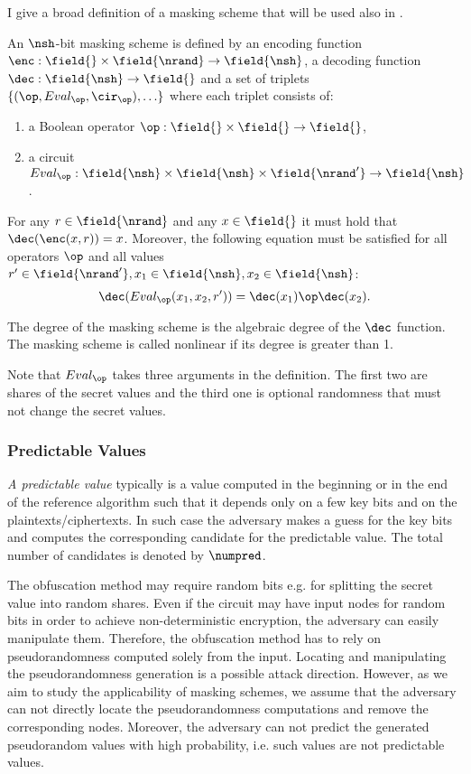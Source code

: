 I give a broad definition of a masking scheme that will be used also in .

\begin{definition}
An $\nsh$-bit masking scheme is defined by an encoding function $\enc: \field{} \times \field{\nrand} \to \field{\nsh}$, a decoding function $\dec: \field{\nsh} \to \field{}$ and a set of triplets $\{(\op, Eval_\op, \cir_\op), \ldots\}$ where each triplet consists of:
\begin{enumerate}
    \item a Boolean operator $\op: \field{}\times\field{} \to \field{}$,
    \item a circuit $Eval_{\op}: \field{\nsh}\times\field{\nsh}\times\field{\nrand'} \to \field{\nsh}$.
\end{enumerate}
For any $r\in\field{\nrand}$ and any $x\in\field{}$ it must hold that $\dec(\enc(x,r)) = x$. Moreover, the following equation must be satisfied for all operators $\op$ and all values $r' \in \field{\nrand'}, x_1 \in \field{\nsh}, x_2 \in \field{\nsh}$:
$$\dec(Eval_{\op}(x_1, x_2, r')) = \dec(x_1) \op \dec(x_2).$$

The degree of the masking scheme is the algebraic degree of the $\dec$ function. The masking scheme is called nonlinear if its degree is greater than 1.
\end{definition}

Note that $Eval_\op$ takes three arguments in the definition. The first two are shares of the secret values and the third one is optional randomness that must not change the secret values. 


\subsubsection{Predictable Values}

\emph{A predictable value} typically is a value computed in the beginning or in the end of the reference algorithm such that it depends only on a few key bits and on the plaintexts/ciphertexts. In such case the adversary makes a guess for the key bits and computes the corresponding candidate for the predictable value. The total number of candidates is denoted by $\numpred$.

The obfuscation method may require random bits e.g. for splitting the secret value into random shares. Even if the circuit may have input nodes for random bits in order to achieve non-deterministic encryption, the adversary can easily manipulate them. Therefore, the obfuscation method has to rely on pseudorandomness computed solely from the input. Locating and manipulating the pseudorandomness generation is a possible attack direction. However, as we aim to study the applicability of masking schemes, we assume that the adversary can not directly locate the pseudorandomness computations and remove the corresponding nodes. Moreover, the adversary can not predict the generated pseudorandom values with high probability, i.e. such values are not predictable values. 

